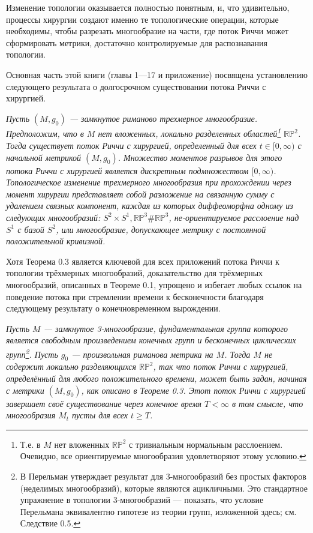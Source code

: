 Изменение топологии оказывается полностью понятным, и, что удивительно, 
процессы хирургии создают именно те топологические операции, которые необходимы, 
чтобы разрезать многообразие на части, где поток Риччи может сформировать 
метрики, достаточно контролируемые для распознавания топологии.

Основная часть этой книги (главы 1—17 и приложение) посвящена установлению 
следующего результата о долгосрочном существовании потока Риччи с хирургией.

\begin{theorem}
\textit{Пусть $(M, g_{0})$ — замкнутое риманово трехмерное 
многообразие. Предположим, что в $M$ нет вложенных, локально разделенных областей\footnote{Т.е. в $M$ нет вложенных $\mathbb{RP}^2$ с тривиальным нормальным расслоением. Очевидно, все ориентируемые многообразия удовлетворяют этому условию.} 
$\mathbb{RP}^2$. Тогда существует поток Риччи с хирургией, 
определенный для всех $t\in [0,\infty)$ с начальной метрикой $(M, g_{0})$. 
Множество моментов разрывов для этого потока Риччи с хирургией является 
дискретным подмножеством $[0,\infty)$.
Топологическое изменение трехмерного многообразия при прохождении через 
момент хирургии представляет собой разложение на связанную сумму с 
удалением связных компонент, каждая из которых диффеоморфна одному из 
следующих многообразий: $S^{2}\times S^{1}, \mathbb{RP}^3 \# \mathbb{RP}^3$, не-ориентируемое 
расслоение над $S^{1}$ с базой $S^{2}$, или многообразие, допускающее 
метрику с постоянной положительной кривизной.}
\end{theorem}

Хотя Теорема 0.3 является ключевой для всех приложений потока Риччи к 
топологии трёхмерных многообразий, доказательство для трёхмерных многообразий, 
описанных в Теореме 0.1, упрощено и избегает любых ссылок на поведение потока 
при стремлении времени к бесконечности благодаря следующему результату о 
конечновременном вырождении.

\begin{theorem}
\textit{Пусть $M$ — замкнутое 3-многообразие, фундаментальная группа которого 
является свободным произведением конечных групп и бесконечных циклических групп\footnote{В \cite{c54} Перельман утверждает результат для 3-многообразий без простых факторов (неделимых многообразий), которые являются ацикличными. Это стандартное упражнение в топологии 3-многообразий — показать, что условие Перельмана эквивалентно гипотезе из теории групп, изложенной здесь; см. Следствие 0.5.}. 
Пусть $g_{0}$ — произвольная риманова метрика на $M$. Тогда $M$ не содержит локально 
разделяющихся $\mathbb{RP}^2$, так что поток Риччи с хирургией, определённый для любого 
положительного времени, может быть задан, начиная с метрики $(M,g_{0})$, как описано 
в Теореме 0.3. Этот поток Риччи с хирургией завершает своё существование через 
конечное время $T<\infty$ в том смысле, что многообразия $M_{t}$ пусты для всех $t \geq T$.}
\end{theorem}

